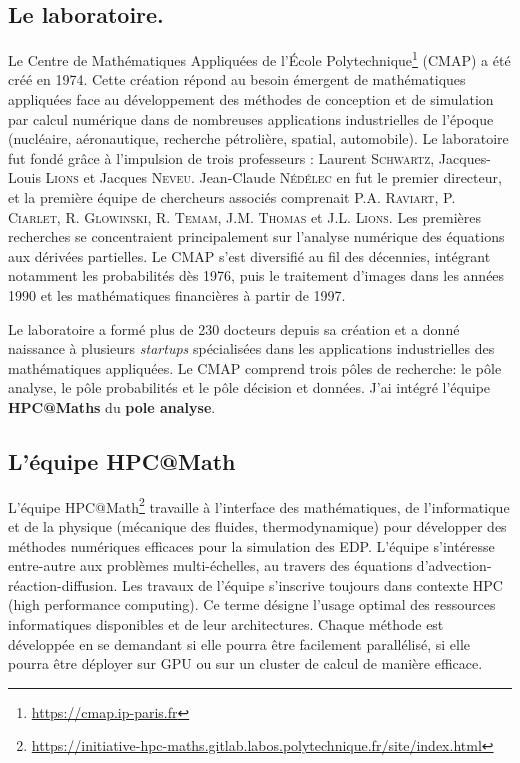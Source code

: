 \subsection{Le laboratoire.}
Le Centre de Mathématiques Appliquées de l'École Polytechnique\footnote{\href{https://cmap.ip-paris.fr}{https://cmap.ip-paris.fr}} (CMAP) a été créé en 1974.
Cette création répond au besoin émergent de mathématiques appliquées face au développement des méthodes de conception et de simulation par calcul numérique dans de nombreuses applications industrielles de l'époque (nucléaire, aéronautique, recherche pétrolière, spatial, automobile).
Le laboratoire fut fondé grâce à l'impulsion de trois professeurs : Laurent \textsc{Schwartz}, Jacques-Louis \textsc{Lions} et Jacques \textsc{Neveu}. Jean-Claude \textsc{Nédélec} en fut le premier directeur, et la première équipe de chercheurs associés comprenait P.A. \textsc{Raviart}, P. \textsc{Ciarlet}, R. \textsc{Glowinski}, R. \textsc{Temam}, J.M. \textsc{Thomas} et J.L. \textsc{Lions}. 
Les premières recherches se concentraient principalement sur l'analyse numérique des équations aux dérivées partielles.
Le CMAP s'est diversifié au fil des décennies, intégrant notamment les probabilités dès 1976, puis le traitement d'images dans les années 1990 et les mathématiques financières à partir de 1997. 

Le laboratoire a formé plus de 230 docteurs depuis sa création et a donné naissance à plusieurs \textit{startups} spécialisées dans les applications industrielles des mathématiques appliquées.
Le CMAP comprend trois pôles  de recherche: le pôle analyse, le pôle probabilités et le pôle décision et données.
J'ai intégré l'équipe \textbf{HPC@Maths} du \textbf{pole analyse}.
\subsection{L'équipe HPC@Math}
    L'équipe HPC@Math\footnote{\href{https://initiative-hpc-maths.gitlab.labos.polytechnique.fr/site/index.html}{https://initiative-hpc-maths.gitlab.labos.polytechnique.fr/site/index.html}} 
    travaille à l'interface des mathématiques, de l'informatique et de la physique (mécanique des fluides, thermodynamique) pour développer 
    des méthodes numériques efficaces pour la simulation des EDP. 
    L’équipe s'intéresse entre-autre aux problèmes multi-échelles, au travers des équations d'advection-réaction-diffusion.
    Les travaux de l'équipe s'inscrive toujours dans contexte HPC (high performance computing). 
    Ce terme désigne l'usage optimal des ressources informatiques disponibles et de leur architectures. 
    Chaque méthode est développée en se demandant si elle pourra être facilement parallélisé, si elle pourra être déployer sur GPU ou sur un cluster de calcul de manière efficace. 